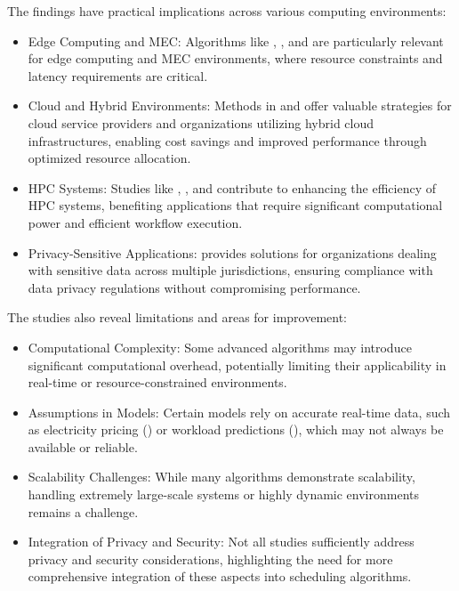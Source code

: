 \documentclass[a4paper, final]{article}
\begin{document}
\noindent The findings have practical implications across various computing environments:
\begin{itemize}
    \item Edge Computing and MEC: Algorithms like \cite{bib:2_faro}, \cite{bib:6_marine}, and \cite{bib:3_sandcat} are particularly 
    relevant for edge computing and MEC environments, where resource constraints and latency requirements are critical.

    \item Cloud and Hybrid Environments: Methods in \cite{bib:5_epee} and \cite{bib:9} offer valuable strategies for cloud 
    service providers and organizations utilizing hybrid cloud infrastructures, enabling cost savings and 
    improved performance through optimized resource allocation.
    
    \item HPC Systems: Studies like \cite{bib:1_acrl}, \cite{bib:8}, and \cite{bib:10} contribute to enhancing the 
    efficiency of HPC systems, benefiting applications that require significant computational power and efficient workflow execution.
    
    \item Privacy-Sensitive Applications: \cite{bib:7_ppps} provides solutions for organizations dealing with sensitive 
    data across multiple jurisdictions, ensuring compliance with data privacy regulations without compromising performance.
\end{itemize}

\noindent The studies also reveal limitations and areas for improvement:
\begin{itemize}
    \item Computational Complexity: Some advanced algorithms may introduce significant computational 
    overhead, potentially limiting their applicability in real-time or resource-constrained environments.

    \item Assumptions in Models: Certain models rely on accurate real-time data, such as electricity pricing 
    (\cite{bib:5_epee}) or workload predictions (\cite{bib:6_marine}), which may not always be available or reliable.
    
    \item Scalability Challenges: While many algorithms demonstrate scalability, handling extremely large-scale 
    systems or highly dynamic environments remains a challenge.
    
    \item Integration of Privacy and Security: Not all studies sufficiently address privacy and security 
    considerations, highlighting the need for more comprehensive integration of these aspects into scheduling algorithms.
\end{itemize}
\end{document}
